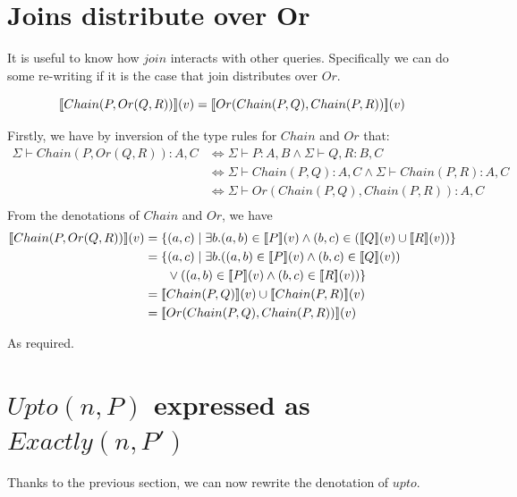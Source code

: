 \documentclass[12pt,a4paper,twoside,openright]{report}
\newcommand{\db}[1]{{\bf [\![}#1{\bf ]\!]}}
\newcommand{\deno}[1]{\db{#1}(v)}
\newcommand{\setComp}[2]{\left\lbrace #1 \mid #2 \right\rbrace}
\newcommand{\typeRule}[2]{\Sigma\vdash #1 \colon #2}
\newcommand{\denoRule}[2]{#1 \in \deno{#2}}
\begin{document}
\section{Joins distribute over Or}
It is useful to know how $join$ interacts with other queries. Specifically we can do some re-writing if it is the case that join distributes over $Or$. 

\begin{equation}
\deno{Chain(P, Or(Q, R))} = \deno{Or(Chain(P,Q), Chain(P, R))}
\end{equation}

Firstly, we have by inversion of the type rules for $Chain$ and $Or$ that:
\begin{equation}\label{typeEquality}
\begin{split}
	\typeRule{Chain(P, Or(Q, R))}{A, C} & \Leftrightarrow \typeRule{P}{A, B} \wedge \typeRule{Q, R}{B, C}\\
									   & \Leftrightarrow \typeRule{Chain(P,Q)}{A, C} \wedge \typeRule{Chain(P, R)}{A, C}\\
									   & \Leftrightarrow \typeRule{Or(Chain(P,Q), Chain(P, R))}{A, C}\\
\end{split}
\end{equation}
From the denotations of $Chain$ and $Or$, we have
\begin{equation}\label{denotationalEquality}
\begin{split}
\deno{Chain(P, Or(Q, R))} & = \setComp{(a, c)}{\exists b. \denoRule{(a, b)}{P} \wedge (b,c) \in (\deno{Q} \cup \deno{R})}\\
						 & = \left\lbrace(a, c) \mid \exists b. (\denoRule{(a, b)}{P} \wedge \denoRule{(b,c)}{Q}) \right.\\
						 & \left.\indent \vee (\denoRule{(a, b)}{P} \wedge \denoRule{(b,c)}{R}) \right\rbrace \\
						 & = \deno{Chain(P, Q)} \cup \deno{Chain(P, R)}\\
						 & = \deno{Or(Chain(P, Q), Chain(P, R))}
\end{split}
\end{equation}

As required.


\section{$Upto(n, P)$ expressed as $Exactly(n, P')$}
\label{UptoOpt}
Thanks to the previous section, we can now rewrite the denotation of $upto$.
\end{document}
